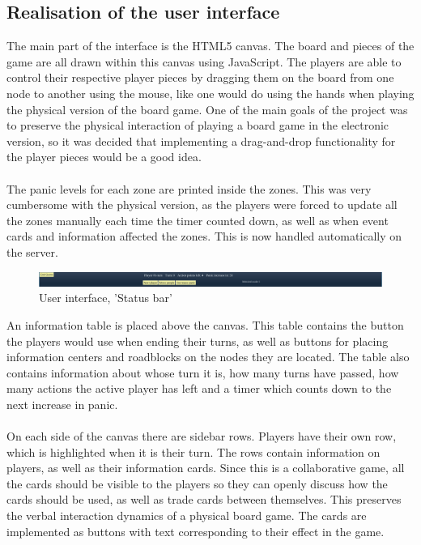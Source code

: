 \subsection{Realisation of the user interface}

The main part of the interface is the HTML5 canvas. The board and pieces of the game are all drawn within this canvas using JavaScript. The players are able to control their respective player pieces by dragging them on the board from one node to another using the mouse, like one would do using the hands when playing the physical version of the board game. One of the main goals of the project was to preserve the physical interaction of playing a board game in the electronic version, so it was decided that implementing a drag-and-drop functionality for the player pieces would be a good idea. \\
\\
The panic levels for each zone are printed inside the zones. This was very cumbersome with the physical version, as the players were forced to update all the zones manually each time the timer counted down, as well as when event cards and information affected the zones. This is now handled automatically on the server. \\


\begin{figure}[H]
  \centering
    \includegraphics[width=1.0\textwidth]{img/statusbar.png}
  \caption{User interface, 'Status bar'} 
  \label{fig:statusbar}
\end{figure}

An information table is placed above the canvas. This table contains the button the players would use when ending their turns, as well as buttons for placing information centers and roadblocks on the nodes they are located. The table also contains information about whose turn it is, how many turns have passed, how many actions the active player has left and a timer which counts down to the next increase in panic. \\
\\
On each side of the canvas there are sidebar rows. Players have their own row, which is highlighted when it is their turn. The rows contain information on players, as well as their information cards. Since this is a collaborative game, all the cards should be visible to the players so they can openly discuss how the cards should be used, as well as trade cards between themselves. This preserves the verbal interaction dynamics of a physical board game. The cards are implemented as buttons with text corresponding to their effect in the game. \\


